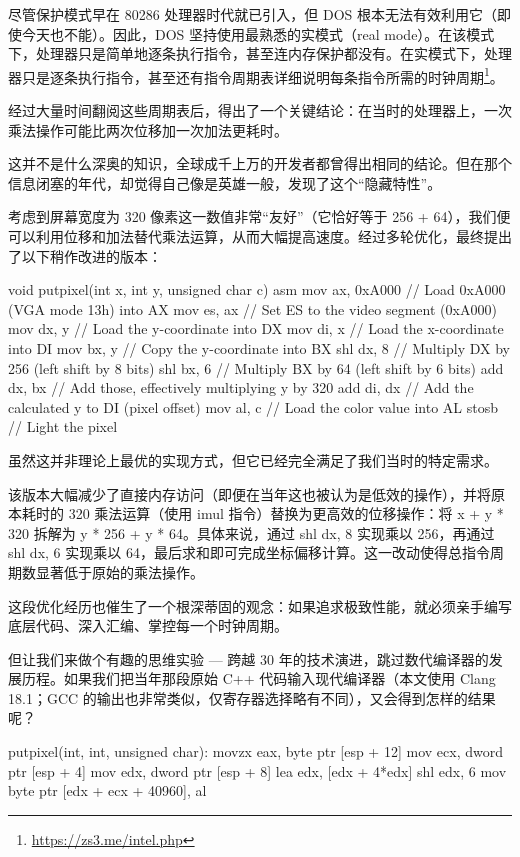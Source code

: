 尽管保护模式早在 80286 处理器时代就已引入，但 DOS 根本无法有效利用它（即使今天也不能）。因此，DOS 坚持使用最熟悉的实模式（real mode）。在该模式下，处理器只是简单地逐条执行指令，甚至连内存保护都没有。在实模式下，处理器只是逐条执行指令，甚至还有指令周期表详细说明每条指令所需的时钟周期\footnote{\url{https://zs3.me/intel.php}}。

经过大量时间翻阅这些周期表后，得出了一个关键结论：在当时的处理器上，一次乘法操作可能比两次位移加一次加法更耗时。

这并不是什么深奥的知识，全球成千上万的开发者都曾得出相同的结论。但在那个信息闭塞的年代，却觉得自己像是英雄一般，发现了这个“隐藏特性”。

考虑到屏幕宽度为 320 像素这一数值非常“友好”（它恰好等于 256 + 64），我们便可以利用位移和加法替代乘法运算，从而大幅提高速度。经过多轮优化，最终提出了以下稍作改进的版本：

\begin{cpp}
void putpixel(int x, int y, unsigned char c) {
asm {
    mov ax, 0xA000 // Load 0xA000 (VGA mode 13h) into AX
    mov es, ax // Set ES to the video segment (0xA000)
    mov dx, y // Load the y-coordinate into DX
    mov di, x // Load the x-coordinate into DI
    mov bx, y // Copy the y-coordinate into BX
    shl dx, 8 // Multiply DX by 256 (left shift by 8 bits)
    shl bx, 6 // Multiply BX by 64 (left shift by 6 bits)
    add dx, bx // Add those, effectively multiplying y by 320
    add di, dx // Add the calculated y to DI (pixel offset)
    mov al, c // Load the color value into AL
    stosb // Light the pixel
  } 
}
\end{cpp}

虽然这并非理论上最优的实现方式，但它已经完全满足了我们当时的特定需求。

该版本大幅减少了直接内存访问（即便在当年这也被认为是低效的操作），并将原本耗时的 320 乘法运算（使用 imul 指令）替换为更高效的位移操作：将 x + y * 320 拆解为 y * 256 + y * 64。具体来说，通过 shl dx, 8 实现乘以 256，再通过 shl dx, 6 实现乘以 64，最后求和即可完成坐标偏移计算。这一改动使得总指令周期数显著低于原始的乘法操作。

这段优化经历也催生了一个根深蒂固的观念：如果追求极致性能，就必须亲手编写底层代码、深入汇编、掌控每一个时钟周期。

但让我们来做个有趣的思维实验 --- 跨越 30 年的技术演进，跳过数代编译器的发展历程。如果我们把当年那段原始 C++ 代码输入现代编译器（本文使用 Clang 18.1；GCC 的输出也非常类似，仅寄存器选择略有不同），又会得到怎样的结果呢？

\begin{shell}
putpixel(int, int, unsigned char):
  movzx eax, byte ptr [esp + 12]
  mov ecx, dword ptr [esp + 4]
  mov edx, dword ptr [esp + 8]
  lea edx, [edx + 4*edx]
  shl edx, 6
  mov byte ptr [edx + ecx + 40960], al
\end{shell}

